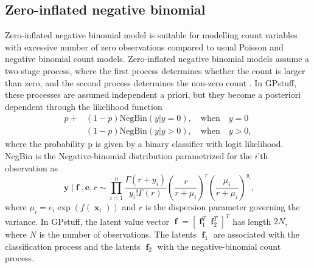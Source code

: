 \documentclass[twoside,11pt]{article}
\DeclareMathOperator{\x}{\mathbf{x}}
\DeclareMathOperator{\f}{\mathbf{f}}
\DeclareMathOperator{\y}{\mathbf{y}}
\newcommand{\mb}{\mathbf}
\newcommand{\pkg}[1]{{\fontseries{b}\selectfont #1}}
\begin{document}
\subsection{Zero-inflated negative binomial}
\label{sec_zinegbin}

Zero-inflated negative binomial model is suitable for modelling count
variables with excessive number of zero observations compared to usual
Poisson and negative binomial count models. Zero-inflated negative
binomial models assume a two-stage process, where the first process
determines whether the count is larger than zero, and the second
process determines the non-zero count \citep{Mullahy:1986}.
In \pkg{GPstuff}, these processes are assumed independent a priori, but they
become a posteriori dependent through the likelihood function
\begin{align}
  p + & (1-p)\mathrm{NegBin}(y|y=0),  \quad\mathrm{when}\quad y=0\\
      & (1-p)\mathrm{NegBin}(y|y>0),  \quad\mathrm{when}\quad y>0,
\end{align}
where the probability p is given by a binary classifier with logit
likelihood. NegBin is the Negative-binomial distribution parametrized
for the $i$'th observation as
\begin{equation}
 \y |\f,\mb{e}, r  \sim \prod_{i=1}^n
 \frac{\Gamma(r+y_i)}{y_i!\Gamma(r)}
\left(\frac{r}{r+\mu_i}\right)^r \left(\frac{\mu_i}{r+\mu_i}\right)^{y_i},
\end{equation}
%
where $\mu_i = e_i\exp(f(\x_i))$ and $r$ is the dispersion parameter
governing the variance. In \pkg{GPstuff}, the latent value vector
$\f=[\f_1^T \f_2^T]^T$ has length $2N$, where $N$ is the number of
observations. The latents $\f_1$ are associated with the
classification process and the latents $\f_2$ with the
negative-binomial count process. %

%     
%
%
%
\end{document}
